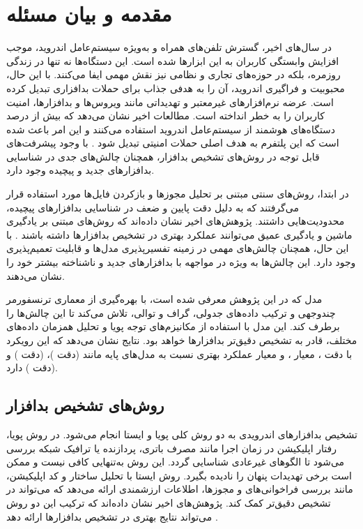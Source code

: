 \section{مقدمه و بیان مسئله}\label{intro}
در سال‌های اخیر، گسترش تلفن‌های همراه و به‌ویژه سیستم‌عامل اندروید، موجب افزایش وابستگی کاربران به این ابزارها شده است. این دستگاه‌ها نه تنها در زندگی روزمره، بلکه در حوزه‌های تجاری و نظامی نیز نقش مهمی ایفا می‌کنند. با این حال، محبوبیت و فراگیری اندروید، آن را به هدفی جذاب برای حملات بدافزاری تبدیل کرده است. عرضه نرم‌افزارهای غیرمعتبر و تهدیداتی مانند ویروس‌ها و بدافزارها، امنیت کاربران را به خطر انداخته است. مطالعات اخیر نشان می‌دهد که بیش از  درصد دستگاه‌های هوشمند از سیستم‌عامل اندروید استفاده می‌کنند و این امر باعث شده است که این پلتفرم به هدف اصلی حملات امنیتی تبدیل شود \cite{AndroidSecurity}. با وجود پیشرفت‌های قابل توجه در روش‌های تشخیص بدافزار، همچنان چالش‌های جدی در شناسایی بدافزارهای جدید و پیچیده وجود دارد.

در ابتدا، روش‌های سنتی مبتنی بر تحلیل مجوزها و بازکردن فایل‌ها مورد استفاده قرار می‌گرفتند که به دلیل دقت پایین و ضعف در شناسایی بدافزارهای پیچیده، محدودیت‌هایی داشتند. پژوهش‌های اخیر نشان داده‌اند که روش‌های مبتنی بر یادگیری ماشین و یادگیری عمیق می‌توانند عملکرد بهتری در تشخیص بدافزارها داشته باشند \cite{DeepLearningMalware}. با این حال، همچنان چالش‌های مهمی در زمینه تفسیرپذیری مدل‌ها و قابلیت تعمیم‌پذیری وجود دارد. این چالش‌ها به ویژه در مواجهه با بدافزارهای جدید و ناشناخته  بیشتر خود را نشان می‌دهند.

مدل  که در این پژوهش معرفی شده است، با بهره‌گیری از معماری ترنسفورمر چندوجهی و ترکیب داده‌های جدولی، گراف و توالی، تلاش می‌کند تا این چالش‌ها را برطرف کند. این مدل با استفاده از مکانیزم‌های توجه پویا و تحلیل همزمان داده‌های مختلف، قادر به تشخیص دقیق‌تر بدافزارها خواهد بود. نتایج نشان می‌دهد که این رویکرد با دقت ، معیار ، و معیار  عملکرد بهتری نسبت به مدل‌های پایه مانند  (دقت )،  (دقت ) و  (دقت ) دارد.

\subsection{روش‌های تشخیص بدافزار}
تشخیص بدافزارهای اندرویدی به دو روش کلی پویا و ایستا انجام می‌شود. در روش پویا، رفتار اپلیکیشن در زمان اجرا مانند مصرف باتری، پردازنده یا ترافیک شبکه بررسی می‌شود تا الگوهای غیرعادی شناسایی گردد. این روش به‌تنهایی کافی نیست و ممکن است برخی تهدیدات پنهان را نادیده بگیرد. روش ایستا با تحلیل ساختار و کد اپلیکیشن، مانند بررسی فراخوانی‌های  و مجوزها، اطلاعات ارزشمندی ارائه می‌دهد که می‌تواند در تشخیص دقیق‌تر کمک کند. پژوهش‌های اخیر نشان داده‌اند که ترکیب این دو روش می‌تواند نتایج بهتری در تشخیص بدافزارها ارائه دهد \cite{AndroidMalwareSurvey}.

